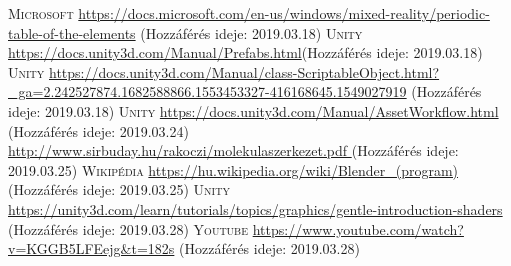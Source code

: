 \documentclass[colorlinks]{thesis-ekf}
\theoremstyle{definition}
\theoremstyle{remark}
\begin{document}
\begin{thebibliography}{1}
	 \textsc{Microsoft} \url{https://docs.microsoft.com/en-us/windows/mixed-reality/periodic-table-of-the-elements} (Hozzáférés ideje: 2019.03.18)
	 \textsc{Unity} \url{https://docs.unity3d.com/Manual/Prefabs.html}(Hozzáférés ideje: 2019.03.18)
	 \textsc{Unity} \url{https://docs.unity3d.com/Manual/class-ScriptableObject.html?_ga=2.242527874.1682588866.1553453327-416168645.1549027919} (Hozzáférés ideje: 2019.03.18)
	 \textsc{Unity} \url{https://docs.unity3d.com/Manual/AssetWorkflow.html}  (Hozzáférés ideje: 2019.03.24)
	 \url{http://www.sirbuday.hu/rakoczi/molekulaszerkezet.pdf } (Hozzáférés ideje: 2019.03.25)
	 \textsc{Wikipédia} \url{https://hu.wikipedia.org/wiki/Blender_(program)} (Hozzáférés ideje: 2019.03.25)
	 \textsc{Unity} \url{https://unity3d.com/learn/tutorials/topics/graphics/gentle-introduction-shaders} (Hozzáférés ideje: 2019.03.28)
	 \textsc{Youtube} \url{https://www.youtube.com/watch?v=KGGB5LFEejg&t=182s} (Hozzáférés ideje: 2019.03.28)
\end{thebibliography}
\end{document}
